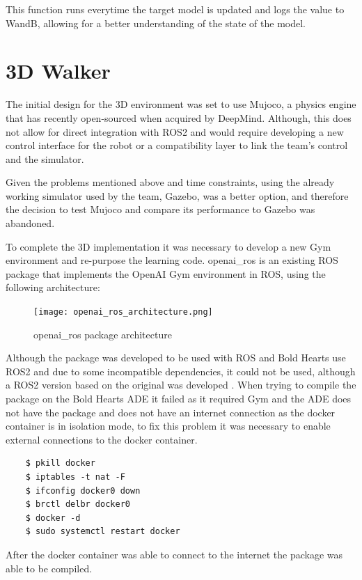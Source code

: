 This function runs everytime the target model is updated and logs the value to WandB, allowing for a better understanding of the state of the model.
\section{3D Walker}
The initial design for the 3D environment was set to use Mujoco, a physics engine that has recently open-sourced when acquired by DeepMind.
Although, this does not allow for direct integration with ROS2 and would require developing a new control interface for the robot or a compatibility layer to link the team's control and the simulator.

Given the problems mentioned above and time constraints, using the already working simulator used by the team, Gazebo, was a better option, and therefore the decision to test Mujoco and compare its performance to Gazebo was abandoned.

To complete the 3D implementation it was necessary to develop a new Gym environment and re-purpose the learning code. 
openai\_ros is an existing ROS package that implements the OpenAI Gym environment in ROS, using the following architecture:

\begin{figure}[H]
    \centering
    \texttt{[image: openai\_ros\_architecture.png]}
    \caption{openai\_ros package architecture\cite{ros-gym}}
\end{figure}

Although the package was developed to be used with ROS and Bold Hearts use ROS2 and due to some incompatible dependencies, it could not be used, although a ROS2 version based on the original was developed \cite{openairos_2}. 
When trying to compile the package on the Bold Hearts ADE it failed as it required Gym and the ADE does not have the package and does not have an internet connection as the docker container is in isolation mode, to fix this problem it was necessary to enable external connections to the docker container.

\begin{lstlisting}
    $ pkill docker
    $ iptables -t nat -F
    $ ifconfig docker0 down
    $ brctl delbr docker0
    $ docker -d
    $ sudo systemctl restart docker
\end{lstlisting}

After the docker container was able to connect to the internet the package was able to be compiled.

